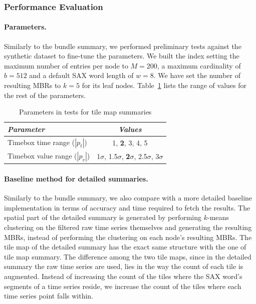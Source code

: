 \subsubsection{Performance Evaluation}
\label{subsubsec:tilemap_sum_benchmarking}

\paragraph{Parameters.} Similarly to the bundle summary, we performed preliminary tests against the synthetic dataset to fine-tune the parameters. We built the \hisax index setting the maximum number of entries per node to $M=200$, a maximum cardinality of $b=512$ and a default SAX word length of $w=8$. We have set the number of resulting MBRs to $k = 5$ for its leaf nodes. Table~\ref{tab:parameters2_vis} lists the range of values for the rest of the parameters.

\begin{table}[!ht]
\centering
\caption{Parameters in tests for tile map summaries}
\begin{footnotesize}
\begin{tabular}{lc} 
\hline
{\em Parameter} &{\em Values} \\
\hline
Timebox time range ($|p_t|$) & 1, {\bf 2}, 3, 4, 5 \\
Timebox value range ($|p_v|$) & 1$\sigma$, 1.5$\sigma$, {\bf 2$\sigma$}, 2.5$\sigma$, 3$\sigma$ \\
\hline
\end{tabular}
\end{footnotesize}
\label{tab:parameters2_vis}
\end{table}

\paragraph{Baseline method for detailed summaries.} Similarly to the bundle summary, we also compare with a more detailed baseline implementation in terms of accuracy and time required to fetch the results. The spatial part of the detailed summary is generated by performing $k$-means clustering on the filtered raw time series themselves and generating the resulting MBRs, instead of performing the clustering on each node's resulting MBRs. The tile map of the detailed summary has the exact same structure with the one of tile map summary. The difference among the two tile maps, since in the detailed summary the raw time series are used, lies in the way the count of each tile is augmented. Instead of increasing the count of the tiles where the SAX word's segments of a time series reside, we increase the count of the tiles where each time series point falls within.

